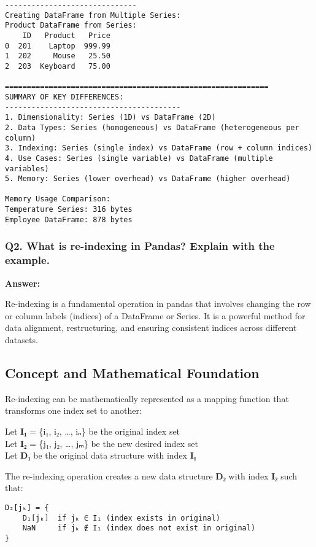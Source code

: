 \documentclass[11pt]{article}
\begin{document}
\begin{Verbatim}[commandchars=\\\{\}]
------------------------------
Creating DataFrame from Multiple Series:
Product DataFrame from Series:
    ID   Product   Price
0  201    Laptop  999.99
1  202     Mouse   25.50
2  203  Keyboard   75.00

============================================================
SUMMARY OF KEY DIFFERENCES:
----------------------------------------
1. Dimensionality: Series (1D) vs DataFrame (2D)
2. Data Types: Series (homogeneous) vs DataFrame (heterogeneous per column)
3. Indexing: Series (single index) vs DataFrame (row + column indices)
4. Use Cases: Series (single variable) vs DataFrame (multiple variables)
5. Memory: Series (lower overhead) vs DataFrame (higher overhead)

Memory Usage Comparison:
Temperature Series: 316 bytes
Employee DataFrame: 878 bytes
    \end{Verbatim}

    \subsubsection{Q2. What is re-indexing in Pandas? Explain with the
example.}\label{q2.-what-is-re-indexing-in-pandas-explain-with-the-example.}

\textbf{Answer:}

Re-indexing is a fundamental operation in pandas that involves changing
the row or column labels (indices) of a DataFrame or Series. It is a
powerful method for data alignment, restructuring, and ensuring
consistent indices across different datasets.

\subsection{Concept and Mathematical
Foundation}\label{concept-and-mathematical-foundation}

Re-indexing can be mathematically represented as a mapping function that
transforms one index set to another:

Let \textbf{I₁} = \{i₁, i₂, \ldots, iₙ\} be the original index set\\
Let \textbf{I₂} = \{j₁, j₂, \ldots, jₘ\} be the new desired index set\\
Let \textbf{D₁} be the original data structure with index \textbf{I₁}

The re-indexing operation creates a new data structure \textbf{D₂} with
index \textbf{I₂} such that:

\begin{verbatim}
D₂[jₖ] = {
    D₁[jₖ]  if jₖ ∈ I₁ (index exists in original)
    NaN     if jₖ ∉ I₁ (index does not exist in original)
}
\end{verbatim}
\end{document}
